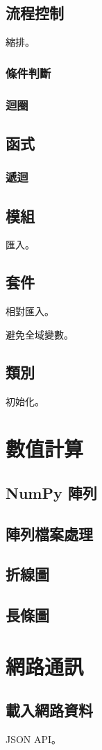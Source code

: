 \documentclass[a4paper,12pt]{book}
\begin{document}
\chapter{流程控制}

縮排。

\section{條件判斷}

\section{迴圈}

\chapter{函式}

\section{遞迴}

\chapter{模組}

匯入。

\chapter{套件}

相對匯入。

避免全域變數。

\chapter{類別}

初始化。

\part{數值計算}

\chapter{NumPy 陣列}

\chapter{陣列檔案處理}

\chapter{折線圖}

\chapter{長條圖}

\part{網路通訊}

\chapter{載入網路資料}

JSON API。

\backmatter
\end{document}
